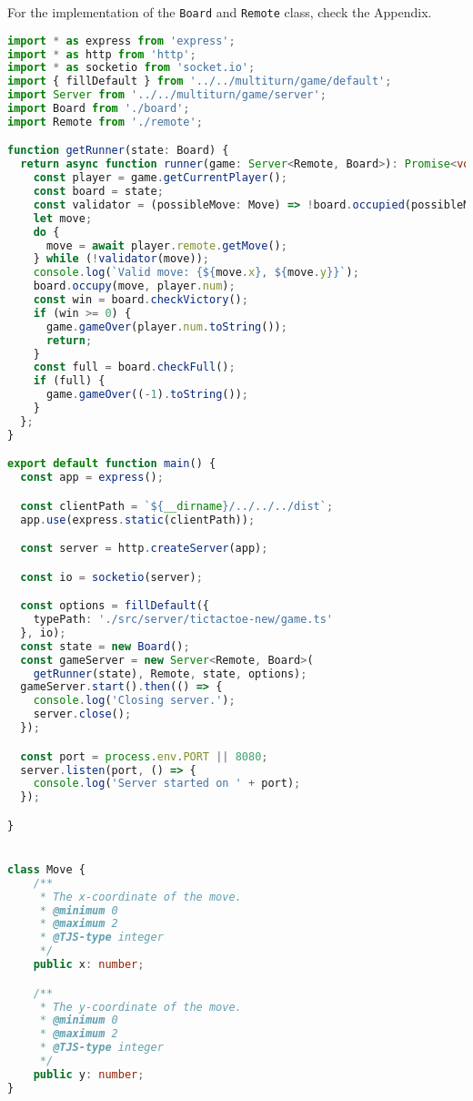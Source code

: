 \documentclass{article}
\begin{document}
For the implementation of the \texttt{Board} and \texttt{Remote} class, check the Appendix.

\begin{lstlisting}[language=Typescript]
import * as express from 'express';
import * as http from 'http';
import * as socketio from 'socket.io';
import { fillDefault } from '../../multiturn/game/default';
import Server from '../../multiturn/game/server';
import Board from './board';
import Remote from './remote';

function getRunner(state: Board) {
  return async function runner(game: Server<Remote, Board>): Promise<void> {
    const player = game.getCurrentPlayer();
    const board = state;
    const validator = (possibleMove: Move) => !board.occupied(possibleMove);
    let move;
    do {
      move = await player.remote.getMove();
    } while (!validator(move));
    console.log(`Valid move: {${move.x}, ${move.y}}`);
    board.occupy(move, player.num);
    const win = board.checkVictory();
    if (win >= 0) {
      game.gameOver(player.num.toString());
      return;
    }
    const full = board.checkFull();
    if (full) {
      game.gameOver((-1).toString());
    }
  };
}

export default function main() {
  const app = express();

  const clientPath = `${__dirname}/../../../dist`;
  app.use(express.static(clientPath));

  const server = http.createServer(app);

  const io = socketio(server);

  const options = fillDefault({
    typePath: './src/server/tictactoe-new/game.ts'
  }, io);
  const state = new Board();
  const gameServer = new Server<Remote, Board>(
    getRunner(state), Remote, state, options);
  gameServer.start().then(() => {
    console.log('Closing server.');
    server.close();
  });

  const port = process.env.PORT || 8080;
  server.listen(port, () => {
    console.log('Server started on ' + port);
  });

}


class Move {
    /**
     * The x-coordinate of the move.
     * @minimum 0
     * @maximum 2
     * @TJS-type integer
     */
    public x: number;

    /**
     * The y-coordinate of the move.
     * @minimum 0
     * @maximum 2
     * @TJS-type integer
     */
    public y: number;
}
\end{lstlisting}
\end{document}
